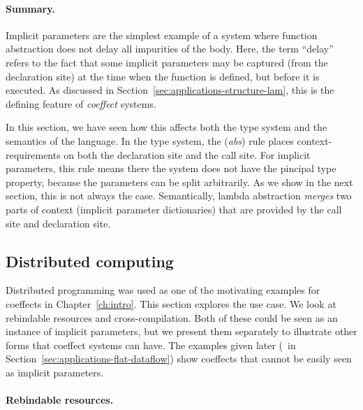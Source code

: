 \paragraph{Summary.}
Implicit parameters are the simplest example of a system where function abstraction does not
delay all impurities of the body. Here, the term ``delay'' refers to the fact that some
implicit parameters may be captured (from the declaration site) at the time when the function is
defined, but before it is executed. As discussed in Section~\ref{sec:applications-structure-lam},
this is the defining feature of \emph{coeffect} systems.

In this section, we have seen how this affects both the type system and the semantics of the
language. In the type system, the (\emph{abs}) rule places context-requirements on both the
declaration site and the call site. For implicit parameters, this rule means there the system does
not have the pincipal type property, because the parameters can be split arbitrarily. As we show in 
the next section, this is not always the case. Semantically, lambda abstraction \emph{merges} two
parts of context (implicit parameter dictionaries) that are provided by the call site and
declaration site.


\subsection{Distributed computing}
\label{sec:applications-flat-distr}

Distributed programming was used as one of the motivating examples for coeffects in
Chapter~\ref{ch:intro}. This section explores the use case. We look at rebindable resources and
cross-compilation. Both of these could be seen as an instance of implicit parameters, but we
present them separately to illustrate other forms that coeffect systems can have. The examples
given later (\eg~in Section~\ref{sec:applications-flat-dataflow}) show coeffects that cannot be
easily seen as implicit parameters.


\paragraph{Rebindable resources.}

